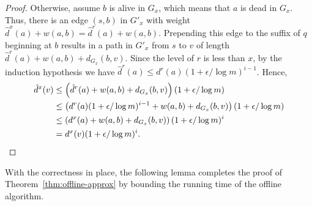 \documentclass[11pt]{article}
\begin{document}
\begin{proof}
    Otherwise, assume $b$ is alive in $G_x$, which means that $a$ is dead in $G_x$.
    Thus, there is an edge $(s,b)$ in $G'_x$ with weight $\hat{d}^x(a)+w(a,b)=\hat{d}^{r}(a) + w(a,b)$.
    Prepending this edge to the suffix of $q$ beginning at $b$ results in a path in $G'_x$ from $s$ to $v$ of length $\hat{d}^{r}(a) + w(a,b) + d_{G_x}(b,v)$. 
    Since the level of $r$ is less than $x$, 
    by the induction hypothesis we have $\hat{d}^{r}(a) \leq d^{r}(a)(1+\epsilon/\log m)^{i-1}$. 
    Hence, 
    \begin{align*}
      \hat{d}^x(v) &\leq  \left(\hat{d}^{r}(a) + w(a, b) + d_{G_x}(b, v)\right)(1 + \epsilon/\log m) \\ 
      &\leq \left(d^r(a)(1+\epsilon/\log m)^{i-1}+ w(a, b) + d_{G_x}(b, v)\right)(1 + \epsilon/\log m) \\
      &\leq \left(d^x(a) + w(a,b) + d_{G_x}(b, v)\right)(1 + \epsilon/\log m)^i \\
      &= d^x(v)(1 + \epsilon/\log m)^i. \qedhere
    \end{align*}
\end{proof}

With the correctness in place, the following lemma completes the proof of Theorem~\ref{thm:offline-approx} by bounding the running time of the offline algorithm. 
\end{document}
